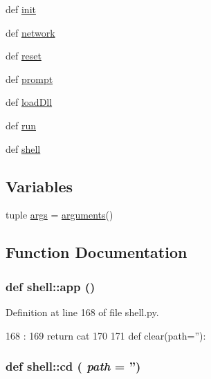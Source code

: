 \begin{DoxyCompactItemize}
\item 
def \hyperlink{namespaceshell_aea65e514317f5f71eb92b6c1434dd3c3}{init}
\item 
def \hyperlink{namespaceshell_a853b1fcfcd4bfff566a3daeebb30bc5c}{network}
\item 
def \hyperlink{namespaceshell_ad0e03c54161e2f3c05d9161b44c6f06d}{reset}
\item 
def \hyperlink{namespaceshell_a66a6092abd286626778dc4efdc5a0e59}{prompt}
\item 
def \hyperlink{namespaceshell_a92a046c771a92b681d7df839ca0ad36c}{loadDll}
\item 
def \hyperlink{namespaceshell_ae5a4056ea469169ac0257d9983b2e524}{run}
\item 
def \hyperlink{namespaceshell_a9d638bc42cd48d04c808504ae4a0e057}{shell}
\end{DoxyCompactItemize}
\subsection*{Variables}
\begin{DoxyCompactItemize}
\item 
tuple \hyperlink{namespaceshell_a2fc1e56d3d0138472f5390c2bd9967fe}{args} = \hyperlink{classarguments_1_1arguments}{arguments}()
\end{DoxyCompactItemize}


\subsection{Function Documentation}
\hypertarget{namespaceshell_a3a6f36f67bd643e51b6f286fb56918e5}{
\subsubsection[{app}]{\setlength{\rightskip}{0pt plus 5cm}def shell::app ()}}
\label{namespaceshell_a3a6f36f67bd643e51b6f286fb56918e5}


Definition at line 168 of file shell.py.


\begin{DoxyCode}
168          :
169   return cat
170 
171 
def clear(path=''):
\end{DoxyCode}
\hypertarget{namespaceshell_a66791c950f1dbb6d5fcf395d9a534b05}{
\subsubsection[{cd}]{\setlength{\rightskip}{0pt plus 5cm}def shell::cd ( {\em path} = {\ttfamily ''})}}
\label{namespaceshell_a66791c950f1dbb6d5fcf395d9a534b05}


